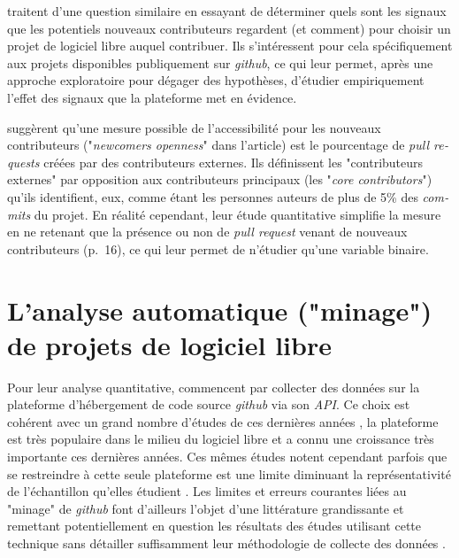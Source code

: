 \documentclass[dvipsnames]{llncs}
\newcommand{\en}[1]{\foreignlanguage{english}{\emph{#1}}}
\begin{document}
    \textcite{signals-2019} traitent d'une question similaire en essayant de déterminer quels sont les signaux
    que les potentiels nouveaux contributeurs regardent (et comment) pour choisir un projet de logiciel libre
    auquel contribuer. Ils s'intéressent pour cela spécifiquement aux projets disponibles publiquement sur
    \en{github}, ce qui leur permet, après une approche exploratoire pour dégager des hypothèses, d'étudier
    empiriquement l'effet des signaux que la plateforme met en évidence.

    \textcite{signals-2019} suggèrent qu'une mesure possible de l'accessibilité pour les nouveaux
    contributeurs ("\en{newcomers openness}" dans l'article) est le pourcentage de \en{pull requests} créées
    par des contributeurs externes. Ils définissent les "contributeurs externes" par opposition aux
    contributeurs principaux (les "\en{core contributors}") qu'ils identifient, eux, comme étant les personnes
    auteurs de plus de 5\% des \en{commits} du projet. En réalité cependant, leur étude quantitative simplifie
    la mesure en ne retenant que la présence ou non de \en{pull request} venant de nouveaux contributeurs
    (p.~16), ce qui leur permet de n'étudier qu'une variable binaire.

    \section{L'analyse automatique ("minage") de projets de logiciel libre}

    Pour leur analyse quantitative, \textcite{signals-2019} commencent par collecter des données sur la
    plateforme d'hébergement de code source \en{github} via son \en{API}. Ce choix est cohérent avec un grand
    nombre d'études de ces dernières années \parencite{github-mapping-2017}, la plateforme est très populaire
    dans le milieu du logiciel libre et a connu une croissance très importante ces dernières années. Ces mêmes
    études notent cependant parfois que se restreindre à cette seule plateforme est une limite diminuant la
    représentativité de l'échantillon qu'elles étudient \parencite{swh-growth-2019}. Les limites et erreurs
    courantes liées au "minage" de \en{github} font d'ailleurs l'objet d'une littérature grandissante et
    remettant potentiellement en question les résultats des études utilisant cette technique sans détailler
    suffisamment leur méthodologie de collecte des données \parencite{mining-github-2014,penumbra-oss-2022}.
\end{document}
